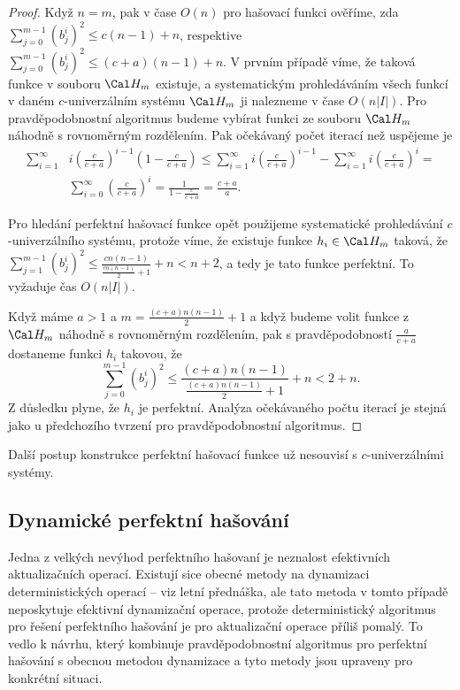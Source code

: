 \documentclass[a4paper,12pt]{article}
\begin{document}
\begin{proof}Když $n=m$, pak v čase $O(n)$ pro  
hašovací funkci ověříme, zda $\sum_{j=0}^{m-1}(b^
i_j)^2\le c(n-1)+n$, respektive 
$\sum_{j=0}^{m-1}(b^i_j)^2\le (c+a)(n-1)+n$.  V prvním případě víme, že taková 
funkce v souboru $\Cal H_m$ existuje, a systematickým prohledáváním 
všech funkcí v daném $c$-univerzálním systému $\Cal H_
m$ ji nalezneme 
v čase $O(n|I|)$.  Pro pravděpodobnostní algoritmus budeme 
vybírat funkci ze souboru $\Cal H_m$ náhodně s rovnoměrným 
rozdělením.  Pak očekávaný počet iterací než uspějeme je 
\begin{align*}\sum_{i=1}^{\infty}&i(\frac c{c+a})^{i-1}(1-\frac c{c+a})
\le\sum_{i=1}^{\infty}i(\frac c{c+a})^{i-1}-\sum_{i=1}^{\infty}i(\frac 
c{c+a})^i=\\
&\sum_{i=0}^{\infty}(\frac c{c+a})^i=\frac 1{1-\frac c{c+a}}=\frac {c
+a}a.\end{align*}

Pro hledání perfektní hašovací funkce opět použijeme 
syste\-ma\-tické prohledávání $c$-univer\-zál\-ního systému, protože 
víme, že existuje funkce $h_i\in \Cal H_m$ taková, že 
$\sum_{j=1}^{m-1}(b^i_j)^2\le\frac {cn(n-1)}{\frac {cn(n-1)}2+1}+
n<n+2$, a tedy je tato funkce perfektní. 
To vyžaduje čas $O(n|I|)$. 

Když máme $a>1$ a $m=\frac {(c+a)n(n-1)}2+1$ 
a když budeme volit funkce z $\Cal H_m$ 
náhodně s rovnoměrným rozdělením, pak s pravděpodobností 
$\frac a{c+a}$ do\-sta\-ne\-me funkci $h_i$ takovou, že 
$$\sum_{j=0}^{m-1}(b^i_j)^2\le\frac {(c+a)n(n-1)}{\frac {(c+a)n(n
-1)}2+1}+n<2+n.$$
Z důsledku plyne, že $h_i$ je perfektní.  Analýza 
očekávaného počtu iterací je stejná jako u předchozího tvrzení 
pro pravděpodobnostní algoritmus. 
\end{proof}

Další postup konstrukce perfektní hašovací funkce už 
nesouvisí s $c$-univerzálními systémy. 

\subsection{
Dynamické perfektní hašování
}

Jedna z velkých nevýhod perfektního hašovaní je 
neznalost efektivních aktualizačních ope\-rací. Existují sice 
obecné meto\-dy na dynamizaci deterministických operací -- viz 
letní přednáš\-ka, ale tato metoda v tomto případě neposkytuje 
efektivní dynamizační operace, protože deterministický 
algoritmus pro ře\-še\-ní perfektního hašování je pro 
aktualizační ope\-race příliš pomalý. To vedlo k návrhu, 
který kombinuje pravděpodobnostní algoritmus pro perfektní 
hašování s obecnou metodou dynami\-za\-ce a tyto metody jsou 
upraveny pro konkrétní situaci. 
\end{document}

